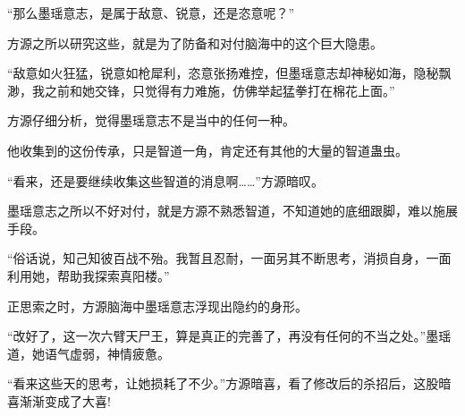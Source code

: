 \begin{this_body}
“那么墨瑶意志，是属于敌意、锐意，还是恣意呢？”

方源之所以研究这些，就是为了防备和对付脑海中的这个巨大隐患。

“敌意如火狂猛，锐意如枪犀利，恣意张扬难控，但墨瑶意志却神秘如海，隐秘飘渺，我之前和她交锋，只觉得有力难施，仿佛举起猛拳打在棉花上面。”

方源仔细分析，觉得墨瑶意志不是当中的任何一种。

他收集到的这份传承，只是智道一角，肯定还有其他的大量的智道蛊虫。

“看来，还是要继续收集这些智道的消息啊……”方源暗叹。

墨瑶意志之所以不好对付，就是方源不熟悉智道，不知道她的底细跟脚，难以施展手段。

“俗话说，知己知彼百战不殆。我暂且忍耐，一面另其不断思考，消损自身，一面利用她，帮助我探索真阳楼。”

正思索之时，方源脑海中墨瑶意志浮现出隐约的身形。

“改好了，这一次六臂天尸王，算是真正的完善了，再没有任何的不当之处。”墨瑶道，她语气虚弱，神情疲惫。

“看来这些天的思考，让她损耗了不少。”方源暗喜，看了修改后的杀招后，这股暗喜渐渐变成了大喜!

\end{this_body}

